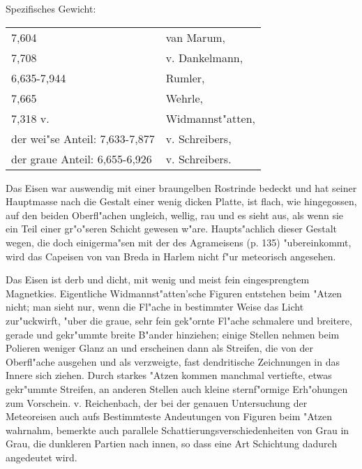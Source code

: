 \documentclass[a4paper, 11pt, oneside]{article}
\begin{document}
Spezifisches Gewicht:  
\begin{table}[!ht]
    \centering\swabfamily\Large
    \begin{tabular}{l l}
        7,604 & van Marum,\\
        7,708 & v. Dankelmann,\\
        6,635-7,944 & Rumler,\\
        7,665 & Wehrle,\\
        7,318 v. & Widmannst"atten,\\
        der wei"se Anteil: 7,633-7,877 & v. Schreibers,\\
        der graue Anteil: 6,655-6,926 & v. Schreibers.
    \end{tabular}
\end{table}

Das Eisen war auswendig mit einer braungelben Rostrinde bedeckt und hat seiner Hauptmasse nach die Gestalt einer wenig dicken Platte, ist flach, wie hingegossen, auf den beiden Oberfl"achen ungleich, wellig, rau und es sieht aus, als wenn sie ein Teil einer gr"o"seren Schicht gewesen w"are. Haupts"achlich dieser Gestalt wegen, die doch einigerma"sen mit der des Agrameisens (p. 135) "ubereinkommt, wird das Capeisen von van Breda in Harlem nicht f"ur meteorisch angesehen.

Das Eisen ist derb und dicht, mit wenig und meist fein eingesprengtem Magnetkies. Eigentliche Widmannst"atten'sche Figuren entstehen beim "Atzen nicht; man sieht nur, wenn die Fl"ache in bestimmter Weise das Licht zur"uckwirft, "uber die graue, sehr fein gek"ornte Fl"ache schmalere und breitere, gerade und gekr"ummte breite B"ander hinziehen; einige Stellen nehmen beim Polieren weniger Glanz an und erscheinen dann als Streifen, die von der Oberfl"ache ausgehen und als verzweigte, fast dendritische Zeichnungen in das Innere sich ziehen. Durch starkes "Atzen kommen manchmal vertiefte, etwas gekr"ummte Streifen, an anderen Stellen auch kleine sternf"ormige Erh"ohungen zum Vorschein. v. Reichenbach, der bei der genauen Untersuchung der Meteoreisen auch aufs Bestimmteste Andeutungen von Figuren beim "Atzen wahrnahm, bemerkte auch parallele Schattierungsverschiedenheiten von Grau in Grau, die dunkleren Partien nach innen, so dass eine Art Schichtung dadurch angedeutet wird.
\end{document}
